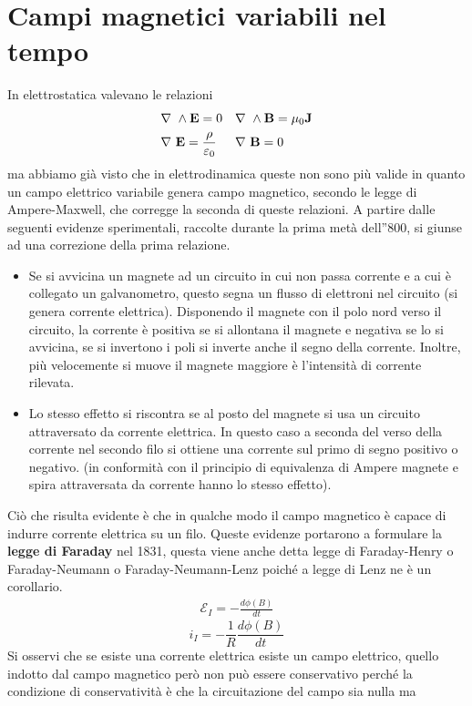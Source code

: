 \documentclass[
10pt, %
a4paper, %
oneside, %
headinclude,footinclude, %
BCOR5mm, %
]{scrartcl}
\begin{document}
\section{Campi magnetici variabili nel tempo}
In elettrostatica valevano le relazioni
\begin{align*}
&\nabla\ \wedge\mathbf{E}=0&&\nabla\ \wedge\mathbf{B}=\mu_0\mathbf{J}\\
&\nabla\ \mathbf{E}=\frac{\rho}{\varepsilon_0}&&\nabla\ \mathbf{B}=0
\end{align*}
ma abbiamo già visto che in elettrodinamica queste non sono più valide in quanto un campo elettrico variabile genera campo magnetico, secondo le legge di Ampere-Maxwell, che corregge la seconda di queste relazioni. A partire dalle seguenti evidenze sperimentali, raccolte durante la prima metà dell''800, si giunse ad una correzione della prima relazione.\\
\begin{itemize}
	\item Se si avvicina un magnete ad un circuito in cui non passa corrente e a cui è collegato un galvanometro, questo segna un flusso di elettroni nel circuito (si genera corrente elettrica). Disponendo il magnete con il polo nord verso il circuito, la corrente è positiva se si allontana il magnete e negativa se lo si avvicina, se si invertono i poli si inverte anche il segno della corrente. Inoltre, più velocemente si muove il magnete maggiore è l'intensità di corrente rilevata.
	\item Lo stesso effetto si riscontra se al posto del magnete si usa un circuito attraversato da corrente elettrica. In questo caso a seconda del verso della corrente nel secondo filo si ottiene una corrente sul primo di segno positivo o negativo. (in conformità con il principio di equivalenza di Ampere magnete e spira attraversata da corrente hanno lo stesso effetto).
\end{itemize}
Ciò che risulta evidente è che in qualche modo il campo magnetico è capace di indurre corrente elettrica su un filo. Queste evidenze portarono a formulare la \textbf{legge di Faraday} nel 1831, questa viene anche detta legge di Faraday-Henry o Faraday-Neumann o Faraday-Neumann-Lenz poiché a legge di Lenz ne è un corollario.
\begin{align}\label{eq:Faraday_integrale}
	\mathcal{E}_I = -\frac{d\phi(B)}{dt}
\end{align}
\[i_I = -\frac{1}{R}\frac{d\phi(B)}{dt}\]
Si osservi che se esiste una corrente elettrica esiste un campo elettrico, quello indotto dal campo magnetico però non può essere conservativo perché la condizione di conservatività è che la circuitazione del campo sia nulla ma
\end{document}

